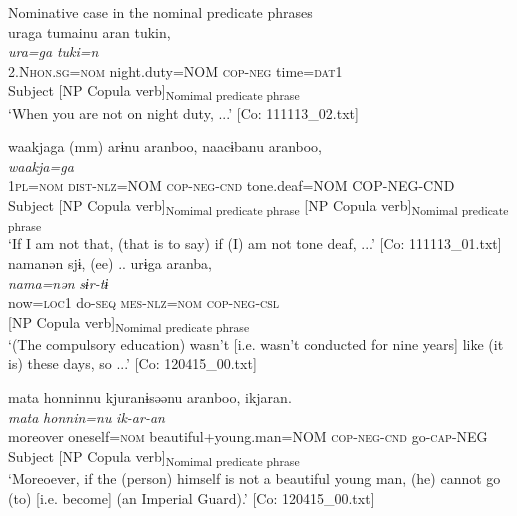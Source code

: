 \ea   Nominative case in the nominal predicate phrases \label{ex:9.64}
\ea \relax [= (5-9 b)]\\
    \gllll  uraga  tumainu  aran  tukin,\\
      \textit{ura=ga}  \textit{}  \textit{}  \textit{tuki=n}\\
      2.N\textsc{hon}.\textsc{sg}=\textsc{nom}  night.duty=NOM  \textsc{cop}-\textsc{neg}  time=\textsc{dat}1\\
      Subject  [NP  {Copula verb]\textsubscript{Nomimal predicate phrase}}  \\
      \glt       ‘When you are not on night duty, ...’ [Co: 111113\_02.txt]

\ex %
     \gllll waakjaga  (mm)  arɨnu  aranboo, naacɨbanu  aranboo,\\
      \textit{waakja=ga}  {}  \textit{}  \textit{}  \textit{}  \textit{}\\                                                                  
      1\textsc{pl}=\textsc{nom}        {}          \textsc{dist}-\textsc{nlz}=NOM  \textsc{cop}-\textsc{neg}-\textsc{cnd}              tone.deaf=NOM  COP-NEG-CND\\
      Subject  {}  [NP  {Copula verb]\textsubscript{Nomimal predicate phrase}} [NP  {Copula verb]\textsubscript{Nomimal predicate phrase}}\\
      \glt  ‘If I am not that, (that is to say) if (I) am not tone deaf, ...’   [Co: 111113\_01.txt]
\ex \label{ex:.c} %
    \gllll  namanən  sjɨ,  {(ee)  ..}  urɨga  aranba,\\
      \textit{nama=nən}  \textit{sɨr-tɨ}  {}    \textit{}  \textit{}\\
      now=\textsc{loc}1  do-\textsc{seq}  {}    \textsc{mes}-\textsc{nlz}=\textsc{nom}  \textsc{cop}-\textsc{neg}-\textsc{csl}\\
      {}    {}  {}  [NP  {Copula verb]\textsubscript{Nomimal predicate phrase}}\\
      \glt       ‘(The compulsory education) wasn’t [i.e. wasn’t conducted for nine years] like (it is) these days, so ...’ [Co: 120415\_00.txt]

\ex  %
     \gllll mata  {\textbar}honnin{\textbar}nu  kjuranɨsəənu   aranboo,  ikjaran.\\
      \textit{mata}  \textit{honnin=nu}  \textit{}  \textit{}  \textit{ik-ar-an}\\                                                                 
      moreover  oneself=\textsc{nom}  beautiful+young.man=NOM              \textsc{cop}-\textsc{neg}-\textsc{cnd}  go-\textsc{cap}-NEG\\
      {}  Subject  [NP     {Copula verb]\textsubscript{Nomimal predicate phrase}}\\
    \glt ‘Moreoever, if the (person) himself is not a beautiful young man, (he) cannot go (to) [i.e. become] (an Imperial Guard).’   [Co: 120415\_00.txt]

